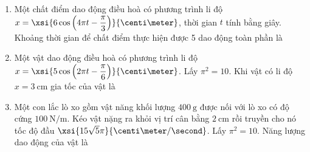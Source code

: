 \begin{enumerate}[label=\bfseries Câu \arabic*:]
\item Một chất điểm dao động điều hoà có phương trình li độ $x=\xsi{6\cos\left(4\pi t-\dfrac{\pi}{3}\right)}{\centi\meter}$, thời gian $t$ tính bằng giây. Khoảng thời gian để chất điểm thực hiện được 5 dao động toàn phần là

\item Một vật dao động điều hoà có phương trình li độ $x=\xsi{5\cos\left(2\pi t-\dfrac{\pi}{6}\right)}{\centi\meter}$. Lấy $\pi^2=10$. Khi vật có li độ $x=\SI{3}{\centi\meter}$ gia tốc của vật là

\item Một con lắc lò xo gồm vật năng khối lượng $\SI{400}{\gram}$ được nối với lò xo có độ cứng $\SI{100}{\newton/\meter}$. Kéo vật nặng ra khỏi vị trí cân bằng $\SI{2}{\centi\meter}$ rồi truyền cho nó tốc độ đầu $\xsi{15\sqrt{5}\pi}{\centi\meter/\second}$. Lấy $\pi^2=10$. Năng lượng dao động của vật là


\end{enumerate}
